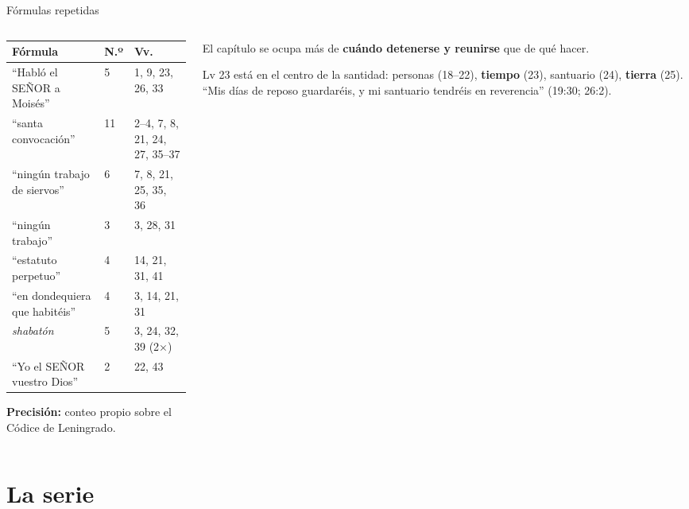 \documentclass[hyperref={bookmarks=false},aspectratio=169]{beamer}
\newcommand{\SENOR}{S{\fontsize{0.78em}{1em}\selectfont EÑOR}}
\newcommand{\destacar}[1]{\textbf{\textcolor{tierraroja}{#1}}}
\newcommand{\precision}[1]{{\footnotesize\color{sepia}\textbf{Precisión:} #1}}
\begin{document}
\begin{frame}{Fórmulas repetidas}
\begin{columns}[c,onlytextwidth]
\begin{column}{0.60\textwidth}
\scriptsize\renewcommand{\arraystretch}{1.06}
\begin{tabular}{@{}L{3.6cm}L{0.6cm}L{2.6cm}@{}}
\toprule
\textbf{Fórmula} & \textbf{N.º} & \textbf{Vv.} \\ \midrule
``Habló el \SENOR{} a Moisés'' & 5 & 1, 9, 23, 26, 33 \\
``santa convocación'' & 11 & 2--4, 7, 8, 21, 24, 27, 35--37 \\
``ningún trabajo de siervos'' & 6 & 7, 8, 21, 25, 35, 36 \\
``ningún trabajo'' & 3 & 3, 28, 31 \\
``estatuto perpetuo'' & 4 & 14, 21, 31, 41 \\
``en dondequiera que habitéis'' & 4 & 3, 14, 21, 31 \\
\emph{shabatón} & 5 & 3, 24, 32, 39 (2×) \\
``Yo el \SENOR{} vuestro Dios'' & 2 & 22, 43 \\
\bottomrule
\end{tabular}\par
\precision{conteo propio sobre el Códice de Leningrado.}
\end{column}
\begin{column}{0.38\textwidth}\small
El capítulo se ocupa más de \destacar{cuándo detenerse y reunirse} que de qué hacer.\par\medskip
\scriptsize Lv 23 está en el centro de la santidad: personas (18--22), \destacar{tiempo} (23), santuario (24), \destacar{tierra} (25). ``Mis días de reposo guardaréis, y mi santuario tendréis en reverencia'' (19:30; 26:2).
\end{column}
\end{columns}
\end{frame}

\section{La serie}
\end{document}
